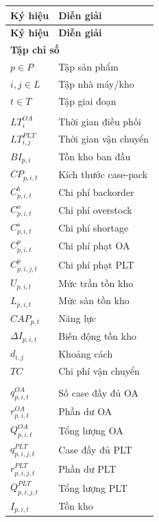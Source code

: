 \documentclass[12pt]{article}
\begin{document}
\begin{longtable}{p{}p{}}
\toprule
\textbf{Ký hiệu} & \textbf{Diễn giải} \\
\midrule
\endfirsthead

\toprule
\textbf{Ký hiệu} & \textbf{Diễn giải} \\
\midrule
\endhead

\multicolumn{2}{l}{\textbf{Tập chỉ số}}\\
$p \in P$ & Tập sản phẩm \\
$i,j \in L$ & Tập nhà máy/kho \\
$t \in T$ & Tập giai đoạn \\

\addlinespace
\multicolumn{2}{l}{\textbf{Tham số}}\\
$LT_i^{OA}$ & Thời gian điều phối \\
$LT_{i,j}^{PLT}$ & Thời gian vận chuyển \\
$BI_{p,i}$ & Tồn kho ban đầu \\
$CP_{p,i,t}$ & Kích thước case-pack \\
$C^b_{p,i,t}$ & Chi phí backorder \\
$C^o_{p,i,t}$ & Chi phí overstock \\
$C^s_{p,i,t}$ & Chi phí shortage \\
$C^p_{p,i,t}$ & Chi phí phạt OA \\
$C^p_{p,i,j,t}$ & Chi phí phạt PLT \\
$U_{p,i,t}$ & Mức trần tồn kho \\
$L_{p,i,t}$ & Mức sàn tồn kho \\
$CAP_{p,t}$ & Năng lực \\
$\Delta I_{p,i,t}$ & Biến động tồn kho \\
$d_{i,j}$ & Khoảng cách \\
$TC$ & Chi phí vận chuyển \\

\addlinespace
\multicolumn{2}{l}{\textbf{Biến}}\\
$q^{OA}_{p,i,t}$ & Số case đầy đủ OA \\
$r^{OA}_{p,i,t}$ & Phần dư OA \\
$Q^{OA}_{p,i,t}$ & Tổng lượng OA \\
$q^{PLT}_{p,i,j,t}$ & Case đầy đủ PLT \\
$r^{PLT}_{p,i,j,t}$ & Phần dư PLT \\
$Q^{PLT}_{p,i,j,t}$ & Tổng lượng PLT \\
$I_{p,i,t}$ & Tồn kho \\
\bottomrule
\end{longtable}
\end{document}
